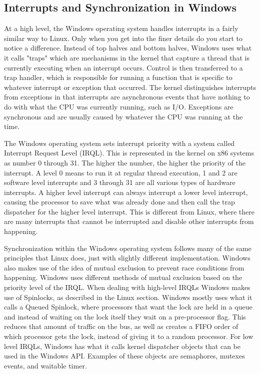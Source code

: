 \documentclass[10pt,serif,draftclsnofoot,onecolumn]{IEEEtran}
\begin{document}
	\subsection{Interrupts and Synchronization in Windows}
	\par
	At a high level, the Windows operating system handles interrupts in a fairly similar way to Linux. Only when you get into the finer details do you start to notice a difference. Instead of top halves and bottom halves, Windows uses what it calls "traps" which are mechanisms in the kernel that capture a thread that is currently executing when an interrupt occurs. Control is then transferred to a trap handler, which is responsible for running a function that is specific to whatever interrupt or exception that occurred\cite{22}. The kernel distinguishes interrupts from exceptions in that interrupts are asynchronous events that have nothing to do with what the CPU was currently running, such as I/O. Exceptions are synchronous and are usually caused by whatever the CPU was running at the time.
	\newline
	\par
	The Windows operating system sets interrupt priority with a system called Interrupt Request Level (IRQL). This is represented in the kernel on x86 systems as number 0 through 31. The higher the number, the higher the priority of the interrupt. A level 0 means to run it at regular thread execution, 1 and 2 are software level interrupts and 3 through 31 are all various types of hardware interrupts\cite{22}. A higher level interrupt can always interrupt a lower level interrupt, causing the processor to save what was already done and then call the trap dispatcher for the higher level interrupt. This is different from Linux, where there are many interrupts that cannot be interrupted and disable other interrupts from happening.
	\newline
	\par
	Synchronization within the Windows operating system follows many of the same principles that Linux does, just with slightly different implementation. Windows also makes use of the idea of mutual exclusion to prevent race conditions from happening. Windows uses different methods of mutual exclusion based on the priority level of the IRQL. When dealing with high-level IRQLs Windows makes use of Spinlocks, as described in the Linux section. Windows mostly uses what it calls a Queued Spinlock, where processors that want the lock are held in a queue and instead of waiting on the lock itself they wait on a pre-processor flag\cite{22}. This reduces that amount of traffic on the bus, as well as creates a FIFO order of which processor gets the lock, instead of giving it to a random processor. For low level IRQLs, Windows has what it calls kernel dispatcher objects that can be used in the Windows API. Examples of these objects are semaphores, mutexes events, and waitable timer\cite{22}.		
\end{document}
